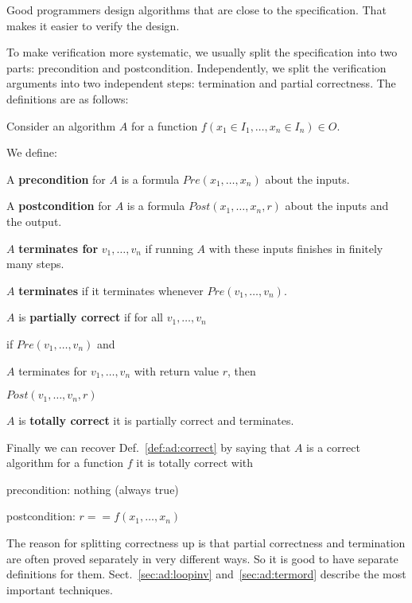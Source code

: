 Good programmers design algorithms that are close to the specification.
That makes it easier to verify the design.

To make verification more systematic, we usually split the specification into two parts: precondition and postcondition.
Independently, we split the verification arguments into two independent steps: termination and partial correctness.
The definitions are as follows:

\begin{definition}\label{def:ad:correct2}
Consider an algorithm $A$ for a function $f(x_1\in I_1,\ldots,x_n\in I_n)\in O$.

We define:
\begin{compactitem}
\item A \textbf{precondition} for $A$ is a formula $Pre(x_1,\ldots,x_n)$ about the inputs.
\item A \textbf{postcondition} for $A$ is a formula $Post(x_1,\ldots,x_n,r)$ about the inputs and the output.
\item $A$ \textbf{terminates for} $v_1,\ldots,v_n$ if running $A$ with these inputs finishes in finitely many steps.
\item $A$ \textbf{terminates} if it terminates whenever $Pre(v_1,\ldots,v_n)$.
\item $A$ is \textbf{partially correct} if for all $v_1,\ldots,v_n$
\begin{compactitem}
 \item if $Pre(v_1,\ldots,v_n)$ and
 \item $A$ terminates for $v_1,\ldots,v_n$ with return value $r$, then
 \item $Post(v_1,\ldots,v_n,r)$
\end{compactitem}
\item $A$ is \textbf{totally correct} it is partially correct and terminates.
\end{compactitem}

Finally we can recover Def.~\ref{def:ad:correct} by saying that $A$ is a correct algorithm for a function $f$ it is totally correct with 
\begin{compactitem}
 \item precondition: nothing (always true)
 \item postcondition: $r==f(x_1,\ldots,x_n)$
\end{compactitem}
\end{definition}

The reason for splitting correctness up is that partial correctness and termination are often proved separately in very different ways.
 So it is good to have separate definitions for them.
 Sect.~\ref{sec:ad:loopinv} and~\ref{sec:ad:termord} describe the most important techniques.

